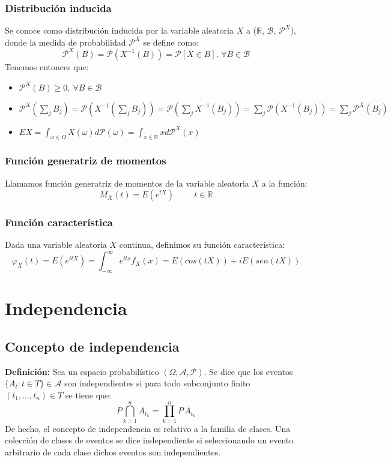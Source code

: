 \subsection{Distribución inducida}
Se conoce como distribución inducida por la variable aleatoria $X$ a ($\mathbb{R}$, $\mathcal{B}$, $\mathcal{P}^X$), donde la medida de probabilidad $\mathcal{P}^X$ se define como:
$$ \mathcal{P}^X(B) = \mathcal{P}(X^{-1}(B)) = \mathcal{P}[X\in B], \, \forall B \in \mathcal{B} $$
Tenemos entonces que:
\begin{itemize}
\item $\mathcal{P}^X(B) \geq 0,\  \forall B \in \mathcal{B}$
\item $\displaystyle \mathcal{P}^X(\sum_j B_j) = \mathcal{P}(X^{-1}(\sum_jB_j)) = \mathcal{P}(\sum_j X^{-1}(B_j)) = \sum_j \mathcal{P}(X^{-1}(B_j)) = \sum_j \mathcal{P}^X(B_j)$
\item $\displaystyle EX = \int_{\omega \in \Omega} X(\omega) d \mathcal{P(\omega)} = \int_{x \in \mathbb{R}} x d\mathcal{P}^X(x)$
\end{itemize}

\subsection{Función generatriz de momentos}
Llamamos función generatriz de momentos de la variable aleatoria $X$ a la función:
$$ M_X(t) = E(e^{tX}) \hspace{1cm} t \in \mathbb{R} $$
\subsection{Función característica}
Dada una variable aleatoria $X$ continua, definimos su función característica:
$$\varphi_X(t)=E(e^{itX})=\int_{-\infty}^{\infty}e^{itx}f_{X}(x)=E(cos(tX))+iE(sen(tX))$$

\chapter{Independencia}
\section{Concepto de independencia}
\textbf{Definición: }Sea un espacio probabilístico $(\Omega,\mathcal{A},\mathcal{P})$. Se dice que los eventos $\{A_t : t\in T \}\in \mathcal{A}$ son independientes si para todo subconjunto finito $(t_1,\ldots ,t_n)\in T$ se tiene que:
$$P\bigcap_{k=1}^n A_{t_k}=\displaystyle\prod_{k=1}^{n}P\, A_{t_k}$$
De hecho, el concepto de independencia es relativo a la familia de clases. Una colección de clases de eventos se dice independiente si seleccionando un evento arbitrario de cada clase dichos eventos son independientes. 

